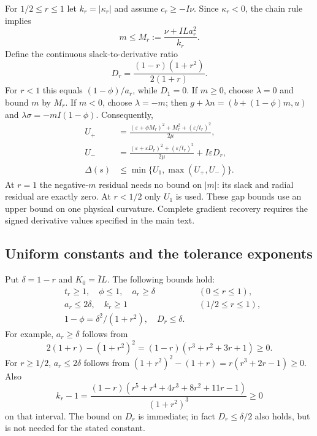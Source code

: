 For $1/2\le r\le1$ let $k_r=|\kappa_r|$ and assume $c_r\ge-I\nu$. Since $\kappa_r<0$, the chain rule implies
\begin{equation}
 m\le M_r:=\frac{\nu+ILa_r^2}{k_r}.
 \label{eq:sstopmplus}
\end{equation}
Define the continuous slack-to-derivative ratio
\begin{equation}
 D_r=\frac{(1-r)(1+r^2)}{2(1+r)}.
 \label{eq:sstopD}
\end{equation}
For $r<1$ this equals $(1-\phi)/a_r$, while $D_1=0$. If $m\ge0$, choose $\lambda=0$ and bound $m$ by $M_r$. If $m<0$, choose $\lambda=-m$; then $g+\lambda n=(b+(1-\phi)m,u)$ and $\lambda\sigma=-mI(1-\phi)$. Consequently,
\begin{equation}
 \begin{aligned}
 U_+&=\frac{(\varepsilon+\phi M_r)^2+M_r^2+(\varepsilon/t_r)^2}{2\mu},\\
 U_-&=\frac{(\varepsilon+\varepsilon D_r)^2+(\varepsilon/t_r)^2}{2\mu}
             +I\varepsilon D_r,\\
 \Delta(s)&\le\min\{U_1,\max(U_+,U_-)\}.
 \end{aligned}
 \label{eq:sstoplocal}
\end{equation}
At $r=1$ the negative-$m$ residual needs no bound on $|m|$: its slack and radial residual are exactly zero. At $r<1/2$ only $U_1$ is used. These gap bounds use an upper bound on one physical curvature. Complete gradient recovery requires the signed derivative values specified in the main text.

\subsection{Uniform constants and the tolerance exponents}
Put $\delta=1-r$ and $K_0=\overline I L$. The following bounds hold:
\begin{equation}
 \begin{aligned}
 &t_r\ge1,\quad \phi\le1,\quad a_r\ge\delta &&(0\le r\le1),\\
 &a_r\le2\delta,\quad k_r\ge1 &&(1/2\le r\le1),\\
 &1-\phi=\delta^2/(1+r^2),\quad D_r\le\delta.
 \end{aligned}
 \label{eq:sstopgeometrybounds}
\end{equation}
For example, $a_r\ge\delta$ follows from
\begin{equation*}
 2(1+r)-(1+r^2)^2=(1-r)(r^3+r^2+3r+1)\ge0.
\end{equation*}
For $r\ge1/2$, $a_r\le2\delta$ follows from $(1+r^2)^2-(1+r)=r(r^3+2r-1)\ge0$. Also
\begin{equation*}
 k_r-1=\frac{(1-r)(r^5+r^4+4r^3+8r^2+11r-1)}{(1+r^2)^3}\ge0
\end{equation*}
on that interval. The bound on $D_r$ is immediate; in fact $D_r\le\delta/2$ also holds, but is not needed for the stated constant.

